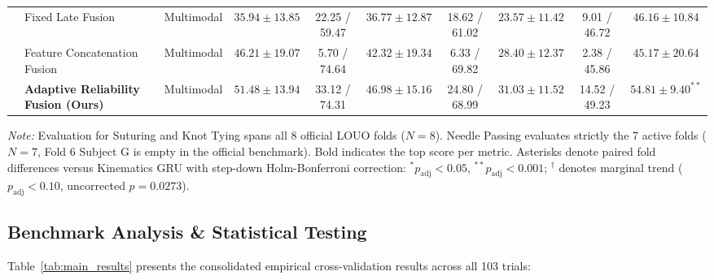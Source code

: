 \documentclass[10pt,journal]{IEEEtran}
\begin{document}
\begin{table}[t]
{\begin{tabular}{llcccccccc}
& Fixed Late Fusion & Multimodal & $35.94 \pm 13.85$ & 22.25 / 59.47 & $36.77 \pm 12.87$ & 18.62 / 61.02 & $23.57 \pm 11.42$ & 9.01 / 46.72 & $46.16 \pm 10.84$ \\
& Feature Concatenation Fusion & Multimodal & $46.21 \pm 19.07$ & 5.70 / 74.64 & $42.32 \pm 19.34$ & 6.33 / 69.82 & $28.40 \pm 12.37$ & 2.38 / 45.86 & $45.17 \pm 20.64$ \\
& \textbf{Adaptive Reliability Fusion (Ours)} & Multimodal & $\mathbf{51.48 \pm 13.94}$ & 33.12 / 74.31 & $\mathbf{46.98 \pm 15.16}$ & 24.80 / 68.99 & $\mathbf{31.03 \pm 11.52}$ & 14.52 / 49.23 & $\mathbf{54.81 \pm 9.40}^{**}$ \\
\bottomrule
\end{tabular}%
}
\vspace{2pt}
\par\noindent\footnotesize\textit{Note:} Evaluation for Suturing and Knot Tying spans all 8 official LOUO folds ($N=8$). Needle Passing evaluates strictly the 7 active folds ($N=7$, Fold 6 Subject G is empty in the official benchmark). Bold indicates the top score per metric. Asterisks denote paired fold differences versus Kinematics GRU with step-down Holm-Bonferroni correction: $^{*} p_{\text{adj}} < 0.05$, $^{**} p_{\text{adj}} < 0.001$; $^{\dagger}$ denotes marginal trend ($p_{\text{adj}} < 0.10$, uncorrected $p=0.0273$).\par
\end{table}

\subsection{Benchmark Analysis \& Statistical Testing}
Table~\ref{tab:main_results} presents the consolidated empirical cross-validation results across all 103 trials:
\end{document}
